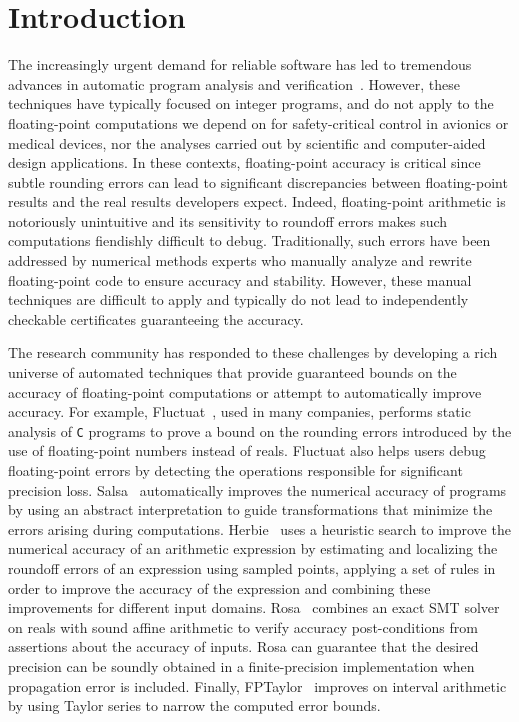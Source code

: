 \documentclass[main.tex]{subfiles}
\begin{document}
\section{Introduction}
\label{sec:intro}

The increasingly urgent demand for reliable software has led to tremendous
advances in automatic program analysis and verification~\cite{cbmc,astree,klee,coverity,mars-code}.
However, these techniques have typically focused on integer programs, and do
not apply to the floating-point computations we depend on for
safety-critical control in avionics or medical devices, nor the analyses
carried out by scientific and computer-aided design applications.  In these
contexts, floating-point accuracy is critical since subtle rounding errors
can lead to significant discrepancies between floating-point results and
the real results developers expect.  Indeed, floating-point
arithmetic is notoriously unintuitive and its sensitivity to roundoff
errors makes such computations fiendishly difficult to debug.
Traditionally, such errors have been addressed by numerical methods experts
who manually analyze and rewrite floating-point code to ensure accuracy and
stability.  However, these manual techniques are difficult to apply and
typically do not lead to independently checkable certificates guaranteeing
the accuracy.

The research community has responded to these challenges by developing
a rich universe of automated techniques that provide guaranteed bounds on the
accuracy of floating-point computations or attempt to automatically improve
accuracy.  For example, Fluctuat~\cite{Goubault13,GMP06}, used in
many companies, performs static analysis of \texttt{C} programs to prove
a bound on the rounding errors introduced by the use of
floating-point numbers instead of reals.  Fluctuat also helps users
debug floating-point errors by detecting the operations responsible for
significant precision loss.  Salsa~\cite{fmics15} automatically improves
the numerical accuracy of programs by using an abstract interpretation to
guide transformations that minimize the errors arising during
computations.  Herbie~\cite{pavel15} uses a heuristic search to improve the numerical
accuracy of an arithmetic expression by estimating and
localizing the roundoff errors of an expression using sampled points,
applying a set of rules in order to improve the accuracy of the expression
and combining these improvements for different input domains.
Rosa~\cite{DarulovaK14} combines
an exact SMT solver on reals with sound affine arithmetic to verify
accuracy post-conditions from assertions about the accuracy of inputs.
Rosa can guarantee that the desired precision
can be soundly obtained in a finite-precision implementation when
propagation error is included.  Finally,
FPTaylor~\cite{fptaylor-fm15} improves on interval arithmetic by using Taylor series to narrow
the computed error bounds.
\end{document}

